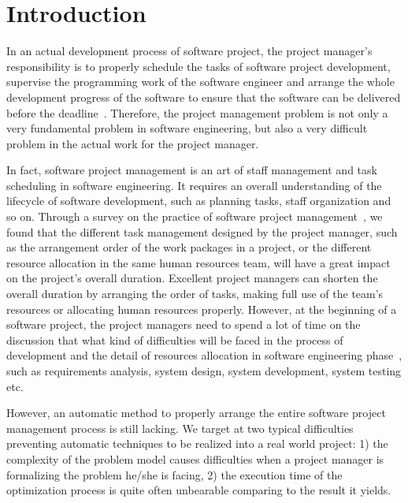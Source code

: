 \section{Introduction}
\vspace{-3mm}
%
In an actual
development process of software project, the project manager's responsibility is
to properly schedule the tasks of software project development, supervise the
programming work of the software engineer and arrange the whole development
progress of the software to ensure that the software can be delivered before the
deadline~\cite{stellman}. 
Therefore, the project management problem is not only
a very fundamental problem in software engineering, but also a very difficult
problem in the actual work for the project manager.

In fact, software project management is an art of staff management and task scheduling in software engineering. It requires an overall understanding of the lifecycle of software development, such as planning tasks, staff organization and so on. 
Through a survey on the practice of software project management~\cite{chang,alba,ren,penta}, we found that the different task management designed by the project manager, such as  the arrangement order of the work packages in a project, or the different  resource allocation in the same human resources team, will have a great  impact on the project's overall duration.
Excellent project managers can  shorten the overall duration by arranging the order of tasks, making full use  of the team's resources or allocating human resources properly. However, at the beginning of a software project, the project managers need to spend a lot  of time on the discussion that what kind of difficulties will be faced in the process of development and the detail of resources allocation in  software engineering phase~\cite{pentico}, such as requirements analysis, system design, system development, system testing etc. 

However, an automatic method to properly arrange the entire software project management process is still lacking. 
We target at two typical difficulties preventing automatic techniques to be realized into a real world project: 
1) the complexity of the problem model causes difficulties when a project manager is formalizing the problem he\slash she is facing, 
2) the execution time of the optimization process is quite often unbearable comparing to the result it yields. 

